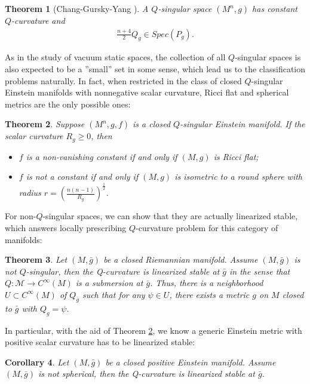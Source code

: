 \documentclass[12pt]{amsart}
\newtheorem{theorem}{Theorem}[section]
\newtheorem{corollary}[theorem]{Corollary}
\theoremstyle{definition}
\theoremstyle{remark}
\numberwithin{equation}{section}
\begin{document}
\begin{theorem}[Chang-Gursky-Yang \cite{C-G-Y}]\label{thm:Q_const}
A $Q$-singular space $(M^n, g)$ has constant $Q$-curvature and 
\begin{align}
\frac{n+4}{2}Q_g \in Spec(P_g).
\end{align}

\end{theorem}

As in the study of vacuum static spaces, the collection of all $Q$-singular spaces is also expected to be a ''small'' set in some sense, which lead us to the classification problems naturally. In fact, when restricted in the class of closed $Q$-singular Einstein manifolds with nonnegative scalar curvature, Ricci flat and spherical metrics are the only possible ones:

 \begin{theorem}\label{Classificaition_Q_singular_Einstein}
Suppose $(M^n,g,f)$ is a closed $Q$-singular Einstein manifold. If the scalar curvature $R_g \geq 0$, then
\begin{itemize}
\item $f$ is a non-vanishing constant if and only if $(M,g)$ is Ricci flat;
\item $f$ is not a constant if and only if $(M,g)$ is isometric to a round sphere with radius $r = \left( \frac{n(n-1)}{R_g}\right)^{\frac{1}{2}}$.
\end{itemize}
\end{theorem}

For non-$Q$-singular spaces, we can show that they are actually linearized stable, which answers locally prescribing $Q$-curvature problem for this category of manifolds:
\begin{theorem}\label{Q_stability}
Let $(M,\bar{g})$ be a closed Riemannian manifold. Assume
$(M,\bar{g})$ is not $Q$-singular, then the Q-curvature is linearized stable at $\bar g$ in the sense that $Q : \mathcal{M} \rightarrow C^{\infty}(M) $ is a submersion at $\bar{g}$.
Thus, there is a neighborhood $U \subset C^{\infty}(M)$ of $Q_{\bar{g}}$ such that for any $\psi \in U$, there exists a metric $g$ on $M$ closed to $\bar{g}$ with $Q_g = \psi$.
\end{theorem}

In particular, with the aid of Theorem \ref{Classificaition_Q_singular_Einstein}, we know a generic Einstein metric with positive scalar curvature has to be linearized stable:

\begin{corollary}\label{cor:stab_pos_Einstein}
Let $(M,\bar{g})$ be a closed positive Einstein manifold. Assume $(M,\bar{g})$ is not spherical, then the Q-curvature is linearized stable at $\bar g$.
\end{corollary}
\end{document}
